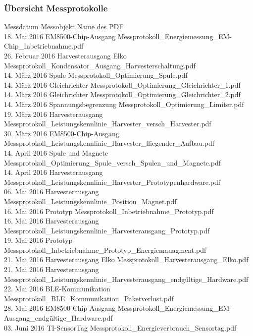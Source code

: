 \subsubsection*{Übersicht Messprotokolle  }
\label{tabelle_uebersicht_messprotokolle}
\begin{tabbing}
       Messdatum	   	\quad\= Messobjekt    		\quad\= Name des PDF     \\[0.8ex]
       18. Mai 2016 	\> EM8500-Chip-Ausgang 		\> Messprotokoll\_Energiemessung\_EM-Chip\_Inbetriebnahme.pdf\\
	   26. Februar 2016 \> Harvesterausgang Elko 	\> Messprotokoll\_Kondensator\_Ausgang\_Harvesterschaltung.pdf\\
	   14. März 2016 	\> Spule 					\> Messprotokoll\_Optimierung\_Spule.pdf\\
	   14. März 2016 	\> Gleichrichter 			\> Messprotokoll\_Optimierung\_Gleichrichter\_1.pdf\\
	   14. März 2016 	\> Gleichrichter 			\> Messprotokoll\_Optimierung\_Gleichrichter\_2.pdf\\
	   14. März 2016 	\> Spannungsbegrenzung 		\> Messprotokoll\_Optimierung\_Limiter.pdf\\
	   19. März 2016 	\> Harvesterausgang 		\> Messprotokoll\_Leistungskennlinie\_Harvester\_versch\_Harvester.pdf\\
	   30. März 2016 	\> EM8500-Chip-Ausgang 		\> Messprotokoll\_Leistungskennlinie\_Harvester\_fliegender\_Aufbau.pdf\\
	   14. April 2016 	\> Spule und Magnete 		\> Messprotokoll\_Optimierung\_Spule\_versch\_Spulen\_und\_Magnete.pdf\\
	   14. April 2016 	\> Harvesterausgang 		\> Messprotokoll\_Leistungskennlinie\_Harvester\_Prototypenhardware.pdf\\
	   06. Mai 2016 	\> Harvesterausgang 		\> Messprotokoll\_Leistungskennlinie\_Position\_Magnet.pdf\\
	   16. Mai 2016 	\> Prototyp 				\> Messprotokoll\_Inbetriebnahme\_Prototyp.pdf\\
	   16. Mai 2016 	\> Harvesterausgang 		\> Messprotokoll\_Leistungskennlinie\_Harvesterausgang\_Prototyp.pdf\\
	   19. Mai 2016 	\> Prototyp 				\> Messprotokoll\_Inbetriebnahme\_Prototyp\_Energiemanagment.pdf\\
	   21. Mai 2016 	\> Harvesterausgang Elko 	\> Messprotokoll\_Harvesterausgang\_Elko.pdf\\
	   21. Mai 2016 	\> Harvesterausgang 		\> Messprotokoll\_Leistungskennlinie\_Harvesterausgang\_endgültige\_Hardware.pdf\\
	   22. Mai 2016 	\> BLE-Kommunikation 		\> Messprotokoll\_BLE\_Kommunikation\_Paketverlust.pdf\\ %
	   28. Mai 2016 	\> EM8500-Chip-Ausgang 		\> Messprotokoll\_Energiemessung\_EM-Ausgang\_endgültige\_Hardware.pdf\\ %
	   03. Juni 2016 	\> TI-SensorTag 			\> Messprotokoll\_Energieverbrauch\_Sensortag.pdf\\
\end{tabbing}  